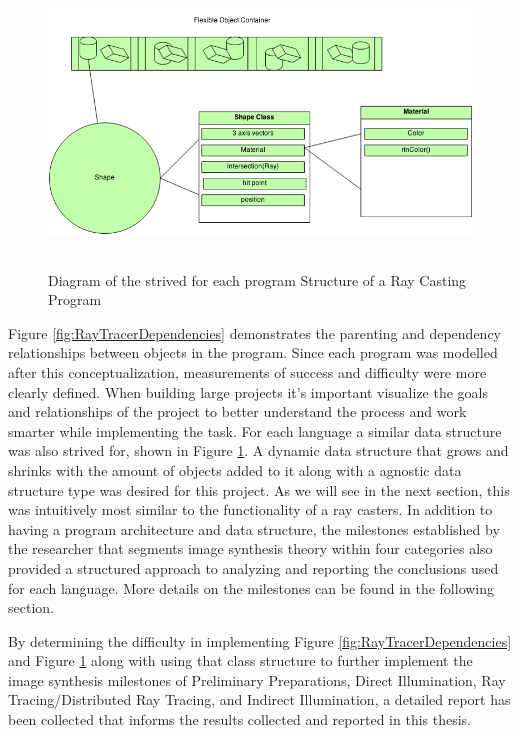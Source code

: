 \begin{figure}[ht]
\centering
\includegraphics[height=3.0in]{figures/data_structure.png}
\caption{Diagram of the strived for each program Structure of a Ray Casting Program}
\label{fig:RayTracerDataStructure}
\end{figure}

Figure \ref{fig:RayTracerDependencies} demonstrates the parenting and dependency relationships between objects in the program.  Since each program was modelled after this conceptualization, measurements of success and difficulty were more clearly defined.  When building large projects it's important visualize the goals and relationships of the project to better understand the process and work smarter while implementing the task.  For each language a similar data structure was also strived for, shown in Figure \ref{fig:RayTracerDataStructure}.  A dynamic data structure that grows and shrinks with the amount of objects added to it along with a agnostic data structure type was desired for this project.  As we will see in the next section, this was intuitively most similar to the functionality of a ray casters.  In addition to having a program architecture and data structure, the milestones established by the researcher that segments image synthesis theory within four categories also provided a structured approach to analyzing and reporting the conclusions used for each language.  More details on the milestones can be found in the following section.

By determining the difficulty in implementing Figure \ref{fig:RayTracerDependencies} and Figure \ref{fig:RayTracerDataStructure} along with using that class structure to further implement the image synthesis milestones of Preliminary Preparations, Direct Illumination, Ray Tracing/Distributed Ray Tracing, and Indirect Illumination, a detailed report has been collected that informs the results collected and reported in this thesis.  